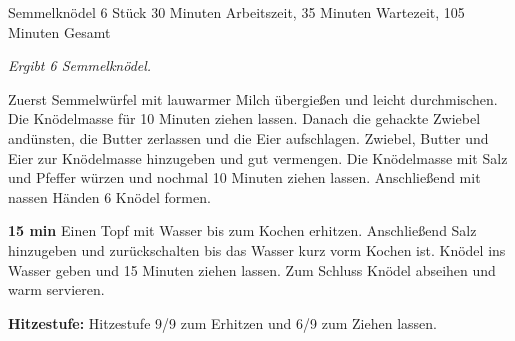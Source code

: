 \begin{recipe}{Semmelknödel} {6 Stück} {30 Minuten Arbeitszeit, 35 Minuten Wartezeit, 105 Minuten Gesamt}

  \freeform{}\textit{Ergibt 6 Semmelknödel.}


  Zuerst Semmelwürfel mit lauwarmer Milch übergießen und leicht durchmischen.
  Die Knödelmasse für 10 Minuten ziehen lassen.
  Danach die gehackte Zwiebel andünsten, die Butter zerlassen und die Eier aufschlagen.
  Zwiebel, Butter und Eier zur Knödelmasse hinzugeben und gut vermengen.
  Die Knödelmasse mit Salz und Pfeffer würzen und nochmal 10 Minuten ziehen lassen.
  Anschließend mit nassen Händen 6 Knödel formen.

  \newstep{}\textbf{15 min}
  Einen Topf mit Wasser bis zum Kochen erhitzen.
  Anschließend Salz hinzugeben und zurückschalten bis das Wasser kurz vorm Kochen ist.
  Knödel ins Wasser geben und 15 Minuten ziehen lassen.
  Zum Schluss Knödel abseihen und warm servieren.

  \freeform{}\hrulefill{}

  \freeform{}\textbf{Hitzestufe:}
  Hitzestufe 9/9 zum Erhitzen und 6/9 zum Ziehen lassen.

\end{recipe}
